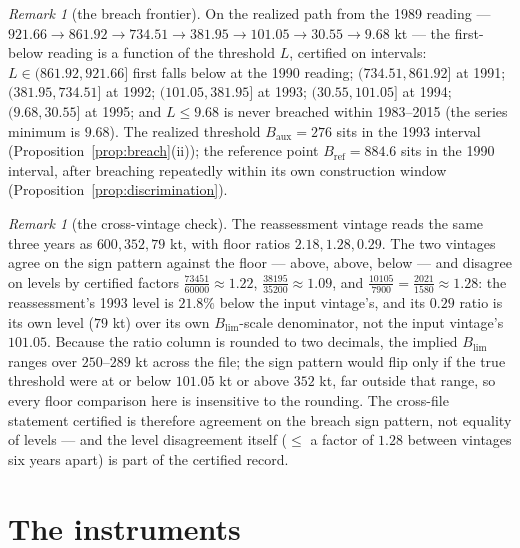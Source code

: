 \documentclass[10pt,twocolumn]{article}
\theoremstyle{plain}
\theoremstyle{remark}
\newtheorem{remark}[theorem]{Remark}
\begin{document}
\begin{remark}[the breach frontier]\label{rem:frontier}
On the realized path from the 1989 reading --- \(921.66 \to 861.92 \to
734.51 \to 381.95 \to 101.05 \to 30.55 \to 9.68\) kt --- the
first-below reading is a function of the threshold \(L\), certified on
intervals: \(L \in (861.92, 921.66]\) first falls below at the 1990
reading; \((734.51, 861.92]\) at 1991; \((381.95, 734.51]\) at 1992;
\((101.05, 381.95]\) at 1993; \((30.55, 101.05]\) at 1994;
\((9.68, 30.55]\) at 1995; and \(L \le 9.68\) is never breached within
1983--2015 (the series minimum is \(9.68\)). The realized threshold
\(B_{\mathrm{aux}} = 276\) sits in the 1993 interval
(Proposition~\ref{prop:breach}(ii)); the reference point
\(B_{\mathrm{ref}} = 884.6\) sits in the 1990 interval, after breaching
repeatedly within its own construction window
(Proposition~\ref{prop:discrimination}).
\end{remark}

\begin{remark}[the cross-vintage check]\label{rem:xtevintage}
The reassessment vintage reads the same three years as
\(600, 352, 79\) kt, with floor ratios \(2.18, 1.28, 0.29\). The two
vintages agree on the sign pattern against the floor --- above, above,
below --- and disagree on levels by certified factors
\(\tfrac{73451}{60000} \approx 1.22\),
\(\tfrac{38195}{35200} \approx 1.09\), and
\(\tfrac{10105}{7900} = \tfrac{2021}{1580} \approx 1.28\): the
reassessment's 1993 level is \(21.8\%\) below the input vintage's, and
its \(0.29\) ratio is its own level (\(79\) kt) over its own
\(B_{\mathrm{lim}}\)-scale denominator, not the input vintage's
\(101.05\). Because the ratio column is rounded to two decimals, the
implied \(B_{\mathrm{lim}}\) ranges over \(250\)--\(289\) kt across
the file; the sign pattern would flip only if the true threshold were
at or below \(101.05\) kt or above \(352\) kt, far outside that range,
so every floor comparison here is insensitive to the rounding. The
cross-file statement certified is therefore agreement on the breach
sign pattern, not equality of levels --- and the level disagreement
itself (\(\le\) a factor of \(1.28\) between vintages six years
apart) is part of the certified record.
\end{remark}

\section{The instruments}\label{instruments}
\end{document}
